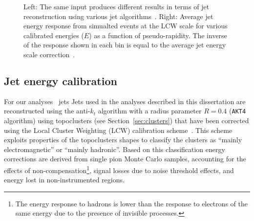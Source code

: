 \begin{figure}[tb]\begin{center}
        \caption{Left: The same input produces different results in terms of jet reconstruction using 
        various jet algorithms~\cite{Salam:2009jx}. Right: Average jet energy response from simualted events
        at the LCW scale for various calibrated energies ($E$) as a function of
        pseudo-rapidity. The inverse of the response shown 
        in each bin is equal to the average jet energy scale correction~\cite{jes}.}
\end{center}\end{figure}


\tocless\subsection{Jet energy calibration}\label{sec:jescalib}
For our analyses~\cite{topcommon2013} jets 
Jets used in the analyses described in this dissertation are 
reconstructed using the anti-$k_t$
algorithm with a radius parameter $R=0.4$ 
(\texttt{AKT4} algorithm) 
using topoclusters (see Section~\ref{sec:clusters})
that have been corrected using the Local Cluster Weighting 
(LCW) calibration scheme~\cite{LCW1,LCW2}.
This scheme exploits properties of the topoclusters shapes 
to classify the clusters as ``mainly electromagnetic'' or
``mainly hadronic''.
Based on this classification energy corrections are derived 
from single pion Monte Carlo samples, accounting for the 
effects of non-compensation\footnote{The energy response 
to hadrons is lower than the response to electrons of the 
same energy due to the presence of invisible processes.}, 
signal losses due to noise 
threshold effects, and energy lost in non-instrumented regions.

